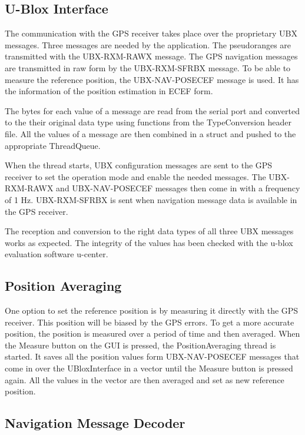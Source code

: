 \subsection{U-Blox Interface}

The communication with the GPS receiver takes place over the proprietary UBX messages.
Three messages are needed by the application.
The pseudoranges are transmitted with the UBX-RXM-RAWX message.
The GPS navigation messages are transmitted in raw form by the UBX-RXM-SFRBX message.
To be able to measure the reference position, the UBX-NAV-POSECEF message is used.
It has the information of the position estimation in ECEF form.

The bytes for each value of a message are read from the serial port and converted to the their original data type using functions from the TypeConversion header file.
All the values of a message are then combined in a struct and pushed to the appropriate ThreadQueue.

When the thread starts, UBX configuration messages are sent to the GPS receiver to set the operation mode and enable the needed messages.
The UBX-RXM-RAWX and UBX-NAV-POSECEF messages then come in with a frequency of 1 Hz.
UBX-RXM-SFRBX is sent when navigation message data is available in the GPS receiver.

The reception and conversion to the right data types of all three UBX messages works as expected.
The integrity of the values has been checked with the u-blox evaluation software u-center.

\subsection{Position Averaging}

One option to set the reference position is by measuring it directly with the GPS receiver.
This position will be biased by the GPS errors.
To get a more accurate position, the position is measured over a period of time and then averaged.
When the Measure button on the GUI is pressed, the PositionAveraging thread is started.
It saves all the position values form UBX-NAV-POSECEF messages that come in over the UBloxInterface in a vector until the Measure button is pressed again.
All the values in the vector are then averaged and set as new reference position.

\subsection{Navigation Message Decoder}

